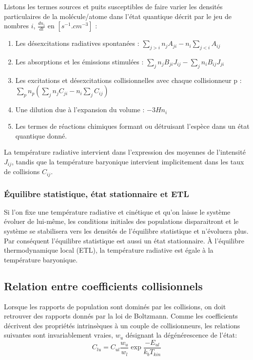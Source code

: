 \documentclass[10pt, a4paper]{report}
\numberwithin{equation}{subsection}
\begin{document}
Listons les termes sources et puits susceptibles de faire varier les densités particulaires de la molécule/atome dans l'état quantique décrit par le jeu de nombres $i$, $\frac{dn_i}{dt}$ en $[s^{-1}.cm^{-3}]$ :\\

\begin{enumerate}
	\item Les désexcitations radiatives spontanées : $\sum\limits_{j>i} n_jA_{ji}-n_i\sum\limits_{j<i} A_{ij}$
	\item Les absorptions et les émissions stimulées : $\sum\limits_{j} n_jB_{ji}J_{ij}-\sum\limits_{j} n_iB_{ij}J_{ji}$
	\item Les excitations et désexcitations collisionnelles avec chaque collisionneur p : \\ $\sum\limits_pn_p\left(\sum\limits_{j} n_j C_{ji}-n_i\sum\limits_j C_{ij}\right)$
	\item Une dilution due à l'expansion du volume : $-3Hn_i$\\
	\item Les termes de réactions chimiques formant ou détruisant l'espèce dans un état quantique donné.
\end{enumerate}
\medskip
\normalsize
La température radiative intervient dans l'expression des moyennes de l'intensité $J_{ij}$, tandis que la température baryonique intervient implicitement dans les taux de collisions $C_{ij}$. 

\subsubsection{\uppercase{é}quilibre statistique, état stationnaire et ETL}
Si l'on fixe une température radiative et cinétique et qu'on laisse le système évoluer de lui-même, les conditions initiales des populations disparaitront et le système se stabilisera vers les densités de l'équilibre statistique et n'évoluera plus. Par conséquent l'équilibre statistique est aussi un état stationnaire. À l'équilibre thermodynamique local (ETL), la température radiative est égale à la température baryonique.

\subsection{Relation entre coefficients collisionnels}
Lorsque les rapports de population sont dominés par les collisions, on doit retrouver des rapports donnés par la loi de Boltzmann. Comme les coefficients décrivent des propriétés intrinsèques à un couple de collisionneurs, les relations suivantes sont invariablement vraies, $w_u$ désignant la dégénérescence de l'état:
\begin{equation} \label{eq:DB}
 \boxed{C_{lu} = C_{ul}\frac{w_u}{w_l}\exp{\frac{-E_{ul}}{k_b T_{kin}}}}
\end{equation}
\end{document}
